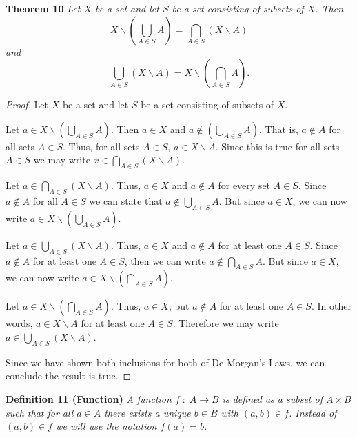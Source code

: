 \documentclass{article}
\begin{document}
\begin{flushleft}
\textbf{Theorem 10}
\textsl{Let $X$ be a set and let $S$ be a set consisting of subsets of $X$. Then
\[
X \backslash \left( \bigcup_{A \in S} A \right) = \bigcap_{A \in S} \left(X \backslash A\right)
\]
and
\[
\bigcup_{A \in S} \left(X \backslash A\right)=X \backslash \left( \bigcap_{A \in S} A \right).
\]}

\begin{proof}
Let $X$ be a set and let $S$ be a set consisting of subsets of $X$.\newline

Let $a \in X \backslash \left( \bigcup_{A \in S} A \right)$. Then $a \in X$ and $a \notin \left( \bigcup_{A \in S} A \right)$. That is, $a \notin A$ for all sets $A \in S$. Thus, for all sets $A \in S$, $a \in X \backslash A$. Since this is true for all sets $A \in S$ we may write $x \in \bigcap_{A \in S} \left( X \backslash A \right)$.\newline

Let $a \in \bigcap_{A \in S} \left(X \backslash A \right)$. Thus, $a \in X$ and $a \notin A$ for every set  $A \in S$. Since $a \notin A$ for all $A \in S$ we can state that $a \notin \bigcup_{A \in S} A$. But since $a \in X$, we can now write $a \in X \backslash \left( \bigcup_{A \in S} A \right)$.\newline

Let $a \in \bigcup_{A \in S} \left( X \backslash A \right)$. Thus, $a \in X$ and $a \notin A$ for at least one $A \in S$. Since $ a \notin A$ for at least one $A \in S$, then we can write $ a \notin \bigcap_{A \in S} A$. But since $a \in X$, we can now write $a \in X \backslash \left( \bigcap_{A \in S} A \right)$.\newline

Let $a \in X \backslash \left( \bigcap_{A \in S} A \right)$. Thus, $a \in X$, but $a \notin A$ for at least one $A \in S$. In other words, $a \in X \backslash A$ for at least one $A \in S$. Therefore we may write $a \in \bigcup_{A \in S} \left(X \backslash A \right)$.\newline

Since we have shown both inclusions for both of De Morgan's Laws, we can conclude the result is true.
\end{proof}

\textbf{Definition 11 (Function)}
\textsl{A function $f \; : \; A \rightarrow B$ is defined as a subset of $A \times B$ such that for all $a \in A$ there exists a unique $b \in B$ with $(a,b) \in f$. Instead of $(a,b) \in f$ we will use the notation $f(a) = b$.}\newline


\end{flushleft}
\end{document}
